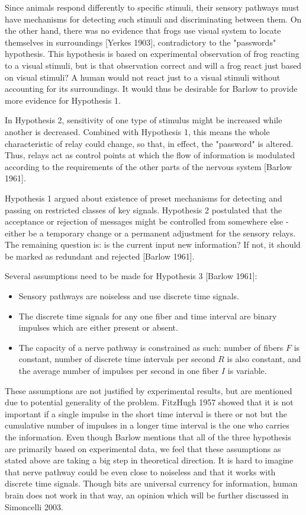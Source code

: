 \documentclass[twoside]{article}
\begin{document}
\begin{multicols}{2}
Since animals respond differently to specific stimuli, their sensory pathways must have mechanisms for detecting such stimuli and discriminating between them. On the other hand, there was no evidence that frogs use visual system to locate themselves in surroundings [Yerkes 1903], contradictory to the "passwords" hypothesis. This hypothesis is based on experimental observation of frog reacting to a visual stimuli, but is that observation correct and will a frog react just based on visual stimuli? A human would not react just to a visual stimuli without accounting for its surroundings. It would thus be desirable for Barlow to provide more evidence for Hypothesis 1. 

In Hypothesis 2, sensitivity of one type of stimulus might be increased while another is decreased. Combined with Hypothesis 1, this means the whole characteristic of relay could change, so that, in effect, the "password" is altered. Thus, relays act as control points at which the flow of information is modulated according to the requirements of the other parts of the nervous system [Barlow 1961].

Hypothesis 1 argued about existence of preset mechanisms for detecting and passing on restricted classes of key signals. Hypothesis 2 postulated that the acceptance or rejection of messages might be controlled from somewhere else - either be a temporary change or a permanent adjustment for the sensory relays. The remaining question is: is the current input new information? If not, it should be marked as redundant and rejected [Barlow 1961]. 

Several assumptions need to be made for Hypothesis 3 [Barlow 1961]:
\begin{itemize}
	\item Sensory pathways are noiseless and use discrete time signals.
	\item The discrete time signals for any one fiber and time interval are binary impulses which are either present or absent.
	\item The capacity of a nerve pathway is constrained as such: number of fibers $F$ is constant, number of discrete time intervals per second $R$ is also constant, and the average number of impulses per second in one fiber $I$ is variable.
\end{itemize}

These assumptions are not justified by experimental results, but are mentioned due to potential generality of the problem. FitzHugh 1957 showed that it is not important if a single impulse in the short time interval is there or not but the cumulative number of impulses in a longer time interval is the one who carries the information. Even though Barlow mentions that all of the three hypothesis are primarily based on experimental data, we feel that these assumptions as stated above are taking a big step in theoretical direction. It is hard to imagine that nerve pathway could be even close to noiseless and that it works with discrete time signals. Though bits are universal currency for information, human brain does not work in that way, an opinion which will be further discussed in Simoncelli 2003. 


\end{multicols}
\end{document}
